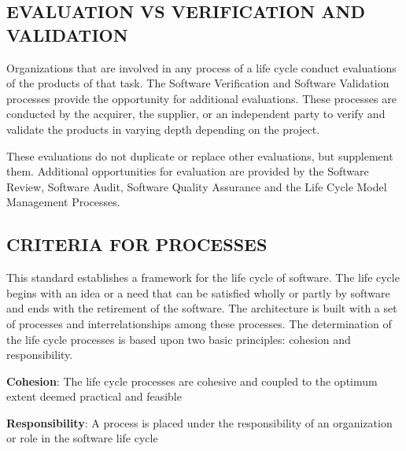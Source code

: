 	\subsection{EVALUATION VS VERIFICATION AND VALIDATION}
	\begin{adjustwidth}{0.5em}{0pt}

		Organizations that are involved in any process of a life cycle conduct evaluations of the products of that task. The Software Verification and Software Validation processes provide the opportunity for additional evaluations. These processes are conducted by the acquirer, the supplier, or an independent party to verify and validate the products in varying depth depending on the project. 

		These evaluations do not duplicate or replace other evaluations, but supplement them. Additional opportunities for evaluation are provided by the Software Review, Software Audit, Software Quality Assurance and the Life Cycle Model Management Processes.

	\end{adjustwidth}


	\subsection{CRITERIA FOR PROCESSES}
	\begin{adjustwidth}{0.5em}{0pt}

		This standard establishes a framework for the life cycle of software. The life cycle begins with an idea or a need that can be satisfied wholly or partly by software and ends with the retirement of the software. The architecture is built with a set of processes and interrelationships among these processes. The determination of the life cycle processes is based upon two basic principles: cohesion and responsibility.\\

		\begin{compactitem}

			\item {\bf Cohesion}: The life cycle processes are cohesive and coupled to the optimum extent deemed practical and feasible \\

			\item {\bf Responsibility}: A process is placed under the responsibility of an organization or role in the software life cycle\\

		\end{compactitem}

	\end{adjustwidth}


